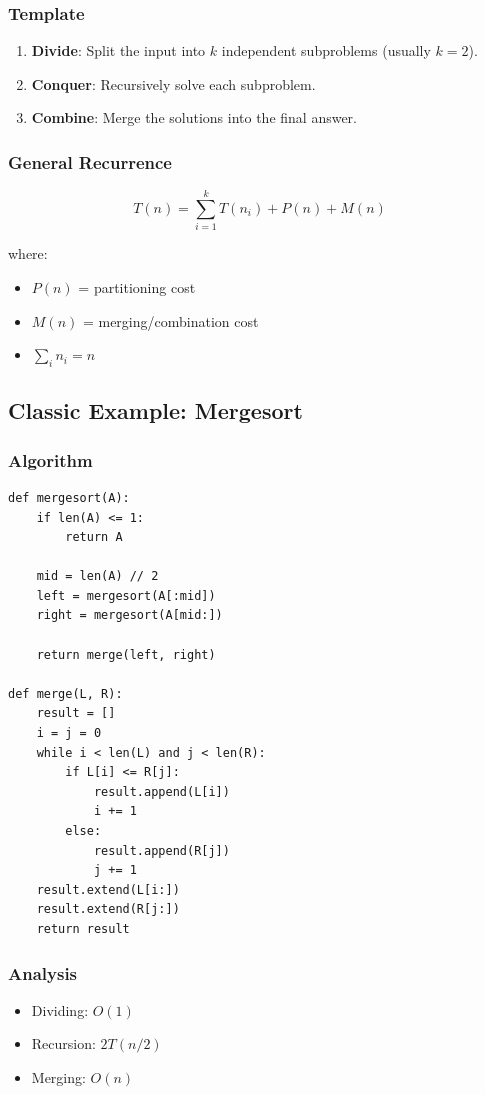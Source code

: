 \documentclass[11pt]{article}
\begin{document}
{\subsubsection*{Template}
\begin{enumerate}
\item \textbf{Divide}: Split the input into $k$ independent subproblems (usually $k=2$).
\item \textbf{Conquer}: Recursively solve each subproblem.
\item \textbf{Combine}: Merge the solutions into the final answer.
\end{enumerate}

\subsubsection*{General Recurrence}
\[
T(n) = \sum_{i=1}^{k} T(n_i) + P(n) + M(n)
\]

where:
\begin{itemize}
\item $P(n)$ = partitioning cost
\item $M(n)$ = merging/combination cost
\item $\sum_i n_i = n$
\end{itemize}

\subsection*{Classic Example: Mergesort}

\subsubsection*{Algorithm}
\begin{lstlisting}
def mergesort(A):
    if len(A) <= 1:
        return A
    
    mid = len(A) // 2
    left = mergesort(A[:mid])
    right = mergesort(A[mid:])
    
    return merge(left, right)

def merge(L, R):
    result = []
    i = j = 0
    while i < len(L) and j < len(R):
        if L[i] <= R[j]:
            result.append(L[i])
            i += 1
        else:
            result.append(R[j])
            j += 1
    result.extend(L[i:])
    result.extend(R[j:])
    return result
\end{lstlisting}

\subsubsection*{Analysis}
\begin{itemize}
\item Dividing: $O(1)$
\item Recursion: $2T(n/2)$
\item Merging: $O(n)$
\end{itemize}

}
\end{document}
